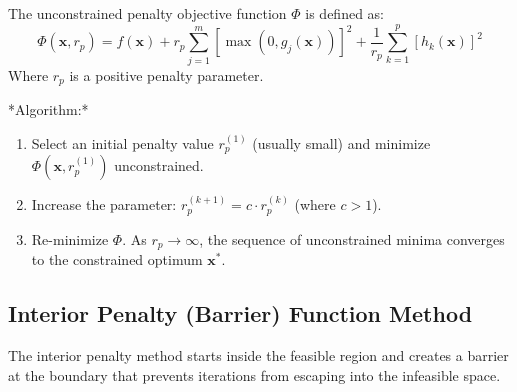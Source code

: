 \documentclass[12pt,a4paper]{article}
\begin{document}
\begin{tcolorbox}[formulabox, title={Exterior Penalty Function Formulation}]
The unconstrained penalty objective function $\Phi$ is defined as:
\begin{equation}
  \Phi(\mathbf{x}, r_p) = f(\mathbf{x}) + r_p \sum_{j=1}^m \left[ \max\left(0, g_j(\mathbf{x})\right) \right]^2 + \frac{1}{r_p} \sum_{k=1}^p \left[ h_k(\mathbf{x}) \right]^2
\end{equation}
Where $r_p$ is a positive penalty parameter.
\par\vspace{3pt}
*Algorithm:*
\begin{enumerate}[label=\textbf{\arabic*.}, leftmargin=*, itemsep=2.5pt]
  \item Select an initial penalty value $r_p^{(1)}$ (usually small) and minimize $\Phi(\mathbf{x}, r_p^{(1)})$ unconstrained.
  \item Increase the parameter: $r_p^{(k+1)} = c \cdot r_p^{(k)}$ (where $c > 1$).
  \item Re-minimize $\Phi$. As $r_p \to \infty$, the sequence of unconstrained minima converges to the constrained optimum $\mathbf{x}^*$.
\end{enumerate}
\end{tcolorbox}

\subsection{Interior Penalty (Barrier) Function Method}
The interior penalty method starts inside the feasible region and creates a barrier at the boundary that prevents iterations from escaping into the infeasible space.
\end{document}
